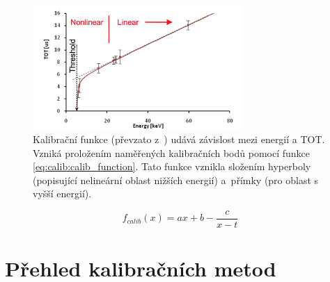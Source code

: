 \begin{figure}[th!]
	\begin{center}
		\includegraphics[width=8cm]{figures/calib_function.png}
		\caption{Kalibrační funkce (převzato z~\cite{Jakubek2011S262}) udává závislost mezi energií a TOT. Vzniká proložením naměřených kalibračních bodů pomocí funkce \ref{eq:calib:calib_function}. Tato funkce vznikla složením hyperboly (popisující nelineární oblast nižších energií) a~přímky (pro oblast s vyšší energií).}
		\label{fig:calib:calib_function}
	\end{center}
\end{figure}


\begin{equation}\label{eq:calib:calib_function}
	f_{calib}(x) = ax + b - \frac{c}{x-t}
\end{equation}


\section{Přehled kalibračních metod}

